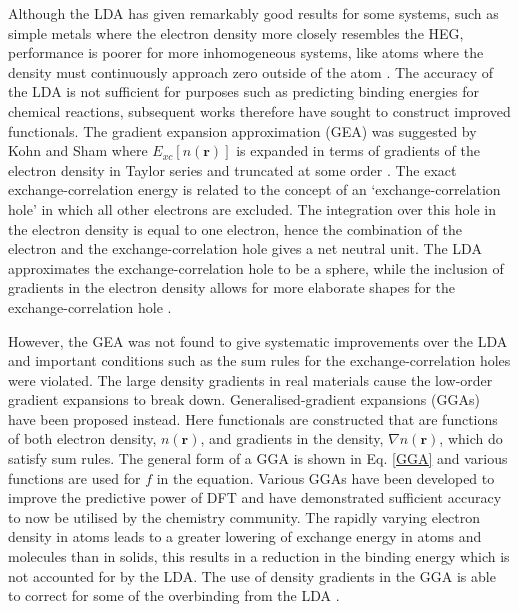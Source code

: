 \documentclass[11pt, twoside]{report}
\begin{document}
Although the LDA has given remarkably good results for some systems, such as simple metals where the electron density more closely resembles the HEG, performance is poorer for more inhomogeneous systems, like atoms where the density must continuously approach zero outside of the atom \cite{RichardMartin_Ch8}. The accuracy of the LDA is not sufficient for purposes such as predicting binding energies for chemical reactions, subsequent works therefore have sought to construct improved functionals. 
The gradient expansion approximation (GEA) was suggested by Kohn and Sham \cite{Kohn_Sham1965} where $E_{xc}[n(\mathbf{r})]$ is expanded in terms of gradients of the electron density in Taylor series and truncated at some order \cite{Prasad_ch3}.
The exact exchange-correlation energy is related to the concept of an `exchange-correlation hole' in which all other electrons are excluded. The integration over this hole in the electron density is equal to one electron, hence the combination of the electron and the exchange-correlation hole gives a net neutral unit. The LDA approximates the exchange-correlation hole to be a sphere, while the inclusion of gradients in the electron density allows for more elaborate shapes for the exchange-correlation hole \cite{RichardMartin_Ch7}.

However, the GEA was not found to give systematic improvements over the LDA and important conditions such as the sum rules for the exchange-correlation holes were violated. The large density gradients in real materials cause the low-order gradient expansions to break down. 
Generalised-gradient expansions (GGAs) have been proposed instead.
Here functionals are constructed that are functions of both electron density, $n(\mathbf{r})$, and gradients in the density, $\nabla n(\mathbf{r})$, which do satisfy sum rules. The general form of a GGA is shown in Eq. \ref{GGA} and various functions are used for $f$ in the equation.
Various GGAs have been developed to improve the predictive power of DFT and have demonstrated sufficient accuracy to now be utilised by the chemistry community.
The rapidly varying electron density in atoms leads to a greater lowering of exchange energy in atoms and molecules than in solids, this results in a reduction in the binding energy which is not accounted for by the LDA. The use of density gradients in the GGA is able to correct for some of the overbinding from the LDA \cite{RichardMartin_Ch8}. 
\end{document}
